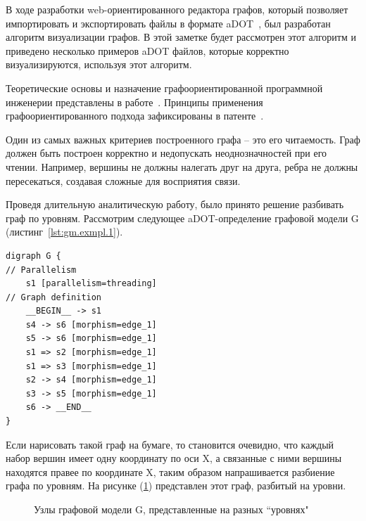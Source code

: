 \def\notedate{2021.12.04}
\def\currentauthor{Ершов В. (РК6-72Б)}

В ходе разработки web-ориентированного редактора графов, который позволяет импортировать и экспортировать файлы в формате aDOT~\cite{SokADOT}, был разработан алгоритм визуализации графов. В этой заметке будет рассмотрен этот алгоритм и приведено несколько примеров aDOT файлов, которые корректно визуализируются, используя этот алгоритм.

Теоретические основы и назначение графоориентированной программной инженерии представлены в работе~\cite{SokPersh2018GBSE}. Принципы применения графоориентированного подхода зафиксированы в патенте~\cite{patentRU2681408}. 

Один из самых важных критериев построенного графа -- это его читаемость. Граф должен быть построен корректно и недопускать неоднозначностей при его чтении. Например, вершины не должны налегать друг на друга, ребра не должны пересекаться, создавая сложные для восприятия связи.

Проведя длительную аналитическую работу, было принято решение разбивать граф по уровням. Рассмотрим следующее aDOT-определение графовой модели \textsf{G} (листинг~\ref{lst:gm.exmpl.1}).

\begin{lstlisting}[frame=single, label={lst:gm.exmpl.1}, caption={Пример aDOT-определение простейшей графовой модели \textsf{G}}, language=aDOTExample]
digraph G {
// Parallelism
	s1 [parallelism=threading]
// Graph definition
	__BEGIN__ -> s1
	s4 -> s6 [morphism=edge_1]
	s5 -> s6 [morphism=edge_1]
	s1 => s2 [morphism=edge_1]
	s1 => s3 [morphism=edge_1]
	s2 -> s4 [morphism=edge_1]
	s3 -> s5 [morphism=edge_1]
	s6 -> __END__ 
}
\end{lstlisting}

Если нарисовать такой граф на бумаге, то становится очевидно, что каждый набор вершин имеет одну координату по оси X, а связанные с ними вершины находятся правее по координате X, таким образом напрашивается разбиение графа по уровням. На рисунке (\ref{fig:graph_levels}) представлен этот граф, разбитый на уровни.

\begin{figure}[ht!]
\caption{Узлы графовой модели \textsf{G}, представленные на разных ``уровнях"}
\label{fig:graph_levels}
\end{figure}

